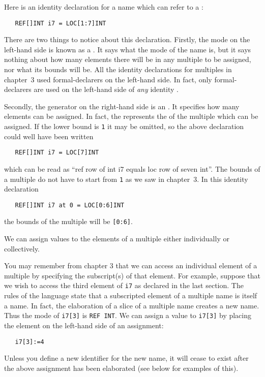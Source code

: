 Here is an identity declaration for a name which can refer to a
:
\begin{verbatim}
   REF[]INT i7 = LOC[1:7]INT
\end{verbatim}
\noindent
There are two things to notice about this declaration.  Firstly, the
mode on the left-hand side is known as a .  It
says what the mode of the name is, but it says nothing about how many
elements there will be in any multiple to be assigned, nor what its
bounds will be.  All the identity declarations for multiples in
chapter~3 used formal-declarers on the left-hand side.  In fact, only
formal-declarers are used on the left-hand side of \emph{any}
identity .

Secondly, the generator on the right-hand side is an
. It specifies how many elements can be
assigned. In fact, the  represents the  of the
multiple which can be assigned.  If the lower bound is \verb|1| it
may be omitted, so the above declaration could well have been written
\begin{verbatim}
   REF[]INT i7 = LOC[7]INT
\end{verbatim}
\noindent
which can be read as ``ref row of int i7 equals loc row of seven
int''.  The bounds of a multiple do not have to start from \verb|1|
as we saw in chapter~3. In this identity declaration
\begin{verbatim}
   REF[]INT i7 at 0 = LOC[0:6]INT
\end{verbatim}
\noindent
the bounds of the multiple will be \verb|[0:6]|.

We can assign values to the elements of a multiple either
individually or collectively.

You may remember from chapter 3 that we can access an individual
element of a multiple by specifying the subscript(s) of that element.
For example, suppose that we wish to access the third element of
\verb|i7| as declared in the last section. The rules of the language
state that a subscripted element of a multiple name is itself a name.
In fact, the elaboration of a slice of a multiple name creates a new
name. Thus the mode of \verb|i7[3]| is \verb|REF INT|. We can assign a
value to \verb|i7[3]| by placing the element on the left-hand side of
an assignment:
\begin{verbatim}
   i7[3]:=4
\end{verbatim}
\noindent
Unless you define a new identifier for the new name, it will cease to
exist after the above assignment has been elaborated (see below for
examples of this).

